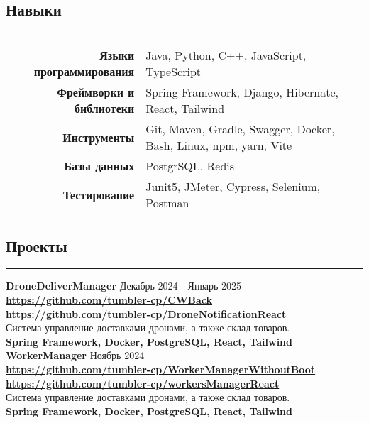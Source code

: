 \documentclass[a4paper,10pt]{article}
\begin{document}
\subsection*{Навыки}
\hrule
\vspace*{5mm}
\begin{tabular}{r | l }
    \textbf{Языки программирования} & Java, Python, C++, JavaScript, TypeScript\\
    \textbf{Фреймворки и библиотеки} & Spring Framework, Django, Hibernate, React, Tailwind \\
    \textbf{Инструменты} & Git, Maven, Gradle, Swagger, Docker, Bash, Linux, npm, yarn, Vite \\
    \textbf{Базы данных} & PostgrSQL, Redis \\
    \textbf{Тестирование} & Junit5, JMeter, Cypress, Selenium, Postman \\
\end{tabular}
\subsection*{Проекты}
\hrule
\vspace*{5mm}
\textbf{DroneDeliverManager} Декабрь 2024 - Январь 2025\\
\faGithub \hspace*{3mm} \textbf{\url{https://github.com/tumbler-cp/CWBack}} \\
\faGithub \hspace*{3mm} \textbf{\url{https://github.com/tumbler-cp/DroneNotificationReact}} \\
Система управление доставками дронами, а также склад товаров. \\
\textbf{Spring Framework, Docker, PostgreSQL, React, Tailwind} \\

\vspace*{5mm}
\noindent\textbf{WorkerManager} Ноябрь 2024\\
\faGithub \hspace*{3mm} \textbf{\url{https://github.com/tumbler-cp/WorkerManagerWithoutBoot}} \\
\faGithub \hspace*{3mm} \textbf{\url{https://github.com/tumbler-cp/workersManagerReact}} \\
Система управление доставками дронами, а также склад товаров. \\
\textbf{Spring Framework, Docker, PostgreSQL, React, Tailwind} \\
\end{document}

